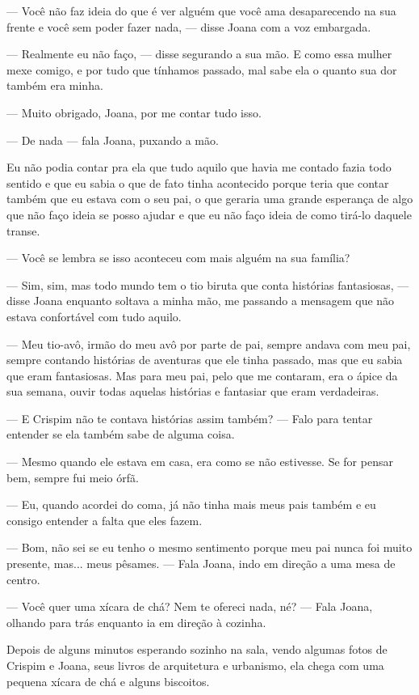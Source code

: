 — Você não faz ideia do que é ver alguém que você ama desaparecendo na sua frente e você sem poder fazer nada, — disse Joana com a voz embargada.

— Realmente eu não faço, — disse segurando a sua mão. E como essa mulher mexe comigo, e por tudo que tínhamos passado, mal sabe ela o quanto sua dor também era minha.

— Muito obrigado, Joana, por me contar tudo isso.

— De nada — fala Joana, puxando a mão.

Eu não podia contar pra ela que tudo aquilo que havia me contado fazia todo sentido e que eu sabia o que de fato tinha acontecido porque teria que contar também que eu estava com o seu pai, o que geraria uma grande esperança de algo que não faço ideia se posso ajudar e que eu não faço ideia de como tirá-lo daquele transe.

— Você se lembra se isso aconteceu com mais alguém na sua família?

— Sim, sim, mas todo mundo tem o tio biruta que conta histórias fantasiosas, — disse Joana enquanto soltava a minha mão, me passando a mensagem que não estava confortável com tudo aquilo.

— Meu tio-avô, irmão do meu avô por parte de pai, sempre andava com meu pai, sempre contando histórias de aventuras que ele tinha passado, mas que eu sabia que eram fantasiosas. Mas para meu pai, pelo que me contaram, era o ápice da sua semana, ouvir todas aquelas histórias e fantasiar que eram verdadeiras.

— E Crispim não te contava histórias assim também? — Falo para tentar entender se ela também sabe de alguma coisa.

— Mesmo quando ele estava em casa, era como se não estivesse. Se for pensar bem, sempre fui meio órfã.

— Eu, quando acordei do coma, já não tinha mais meus pais também e eu consigo entender a falta que eles fazem.

— Bom, não sei se eu tenho o mesmo sentimento porque meu pai nunca foi muito presente, mas... meus pêsames. — Fala Joana, indo em direção a uma mesa de centro.

— Você quer uma xícara de chá? Nem te ofereci nada, né? — Fala Joana, olhando para trás enquanto ia em direção à cozinha.

Depois de alguns minutos esperando sozinho na sala, vendo algumas fotos de Crispim e Joana, seus livros de arquitetura e urbanismo, ela chega com uma pequena xícara de chá e alguns biscoitos.

